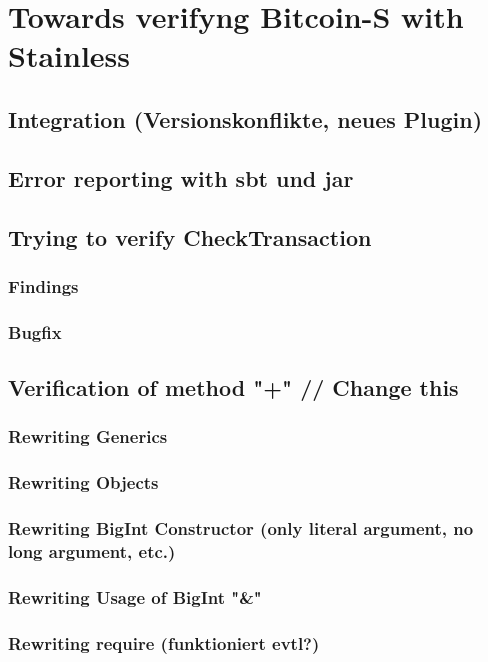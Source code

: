 \chapter{Towards verifyng Bitcoin-S with Stainless}
\label{chap:connecting}

\section{Integration (Versionskonflikte, neues Plugin)}

\section{Error reporting with sbt und jar}

\section{Trying to verify CheckTransaction}
\subsection{Findings}
\subsection{Bugfix}

\section{Verification of method "+" // Change this}
\subsection{Rewriting Generics}
\subsection{Rewriting Objects}
\subsection{Rewriting BigInt Constructor (only literal argument, no long argument, etc.)}
\subsection{Rewriting Usage of BigInt "\&"}
\subsection{Rewriting require (funktioniert evtl?)}

